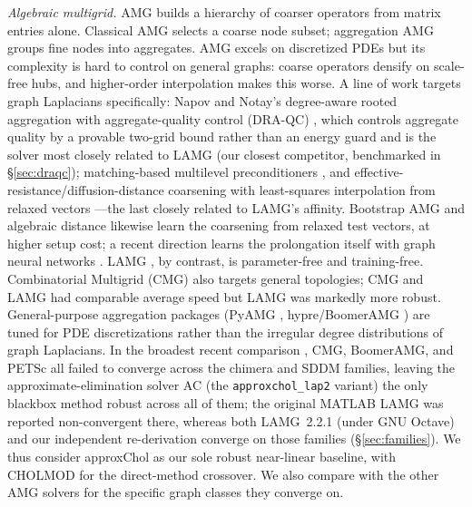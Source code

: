\documentclass[leqno,letterpaper]{etna}
\begin{document}
\emph{Algebraic multigrid.} AMG \cite{brandt-amg,ruge-stuben} builds a hierarchy of coarser
operators from matrix entries alone. Classical AMG selects a coarse node subset; aggregation
AMG \cite{vanek-mandel-brezina,notay} groups fine nodes into aggregates. AMG excels on
discretized PDEs but its complexity is hard to control on general graphs: coarse operators
densify on scale-free hubs, and higher-order interpolation makes this worse. A line of work
targets graph Laplacians specifically: Napov and Notay's degree-aware rooted aggregation with
aggregate-quality control (DRA-QC) \cite{napov-notay}, which controls aggregate quality by a
provable two-grid bound rather than an energy guard and is the solver most closely related to
LAMG (our closest competitor, benchmarked in \S\ref{sec:draqc}); matching-based multilevel preconditioners
\cite{brannick-match}, and effective-resistance/diffusion-distance coarsening with
least-squares interpolation from relaxed vectors \cite{lee2024}---the last closely related to
LAMG's affinity. Bootstrap AMG \cite{brandt-bootstrap} and algebraic distance
\cite{ron-safro-brandt} likewise learn the coarsening from relaxed test vectors, at higher setup
cost; a recent direction learns the prolongation itself with graph neural networks
\cite{learned-amg}. LAMG \cite{lamg}, by contrast, is parameter-free and training-free. Combinatorial
Multigrid (CMG) \cite{cmg} also targets general topologies; CMG and LAMG had comparable average
speed but LAMG was markedly more robust. General-purpose aggregation packages
(PyAMG \cite{pyamg}, hypre/BoomerAMG \cite{boomeramg}) are tuned for PDE discretizations rather
than the irregular degree distributions of graph Laplacians. In the broadest recent comparison
\cite{gks2023}, CMG, BoomerAMG, and PETSc all failed to converge across the chimera and SDDM
families, leaving the approximate-elimination solver AC (the \texttt{approxchol\_lap2} variant)
the only blackbox method robust across all of them; the original MATLAB LAMG was reported
non-convergent there, whereas both LAMG~2.2.1 (under GNU Octave) and our independent re-derivation
converge on those families (\S\ref{sec:families}). We thus consider
approxChol as our sole robust near-linear baseline, with CHOLMOD for the
direct-method crossover. We also compare with the other AMG solvers for the specific graph classes they converge on.
\end{document}
